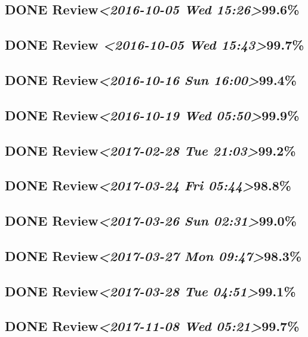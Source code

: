 \documentclass[11pt]{ctexart}
\begin{document}
\subsection{{\bfseries\sffamily DONE} Review\textit{<2016-10-05 Wed 15:26>}99.6\%}
\label{sec:org94315d8}
\subsection{{\bfseries\sffamily DONE} Review \textit{<2016-10-05 Wed 15:43>}99.7\%}
\label{sec:org472506a}
\subsection{{\bfseries\sffamily DONE} Review\textit{<2016-10-16 Sun 16:00>}99.4\%}
\label{sec:org810c102}
\subsection{{\bfseries\sffamily DONE} Review\textit{<2016-10-19 Wed 05:50>}99.9\%}
\label{sec:org2e7056a}
\subsection{{\bfseries\sffamily DONE} Review\textit{<2017-02-28 Tue 21:03>}99.2\%}
\label{sec:org64a415b}
\subsection{{\bfseries\sffamily DONE} Review\textit{<2017-03-24 Fri 05:44>}98.8\%}
\label{sec:orgf0e838d}
\subsection{{\bfseries\sffamily DONE} Review\textit{<2017-03-26 Sun 02:31>}99.0\%}
\label{sec:org4a463c8}
\subsection{{\bfseries\sffamily DONE} Review\textit{<2017-03-27 Mon 09:47>}98.3\%}
\label{sec:orgdfc441c}
\subsection{{\bfseries\sffamily DONE} Review\textit{<2017-03-28 Tue 04:51>}99.1\%}
\label{sec:org408e46d}

\subsection{{\bfseries\sffamily DONE} Review\textit{<2017-11-08 Wed 05:21>}99.7\%}
\label{sec:org385de76}
\end{document}
